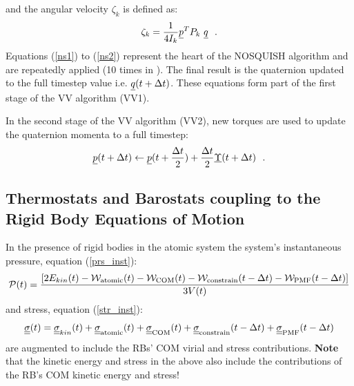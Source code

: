 and the angular velocity $\zeta_{k}$ is defined as:
\begin{equation}
\zeta_{k}={1 \over 4 I_{k}}\mbox{$\underline{p}$}^{T} P_{k}~\mbox{$\underline{q}$}~~.
\end{equation}
Equations (\ref{ns1}) to (\ref{ns2}) represent the heart of the NOSQUISH algorithm
and are repeatedly applied (10 times in \D).  The final result is the quaternion
updated to the full timestep value i.e. $\mbox{$\underline{q}$}(t+\Delta t)$.  These equations
form part of the first stage of the VV algorithm (VV1).

In the second stage of the VV algorithm (VV2), new torques are used to update the
quaternion momenta to a full timestep:
\begin{equation}
\mbox{$\underline{p}$}(t+\Delta t) \leftarrow \mbox{$\underline{p}$}(t+{\Delta t \over 2})+{\Delta t \over 2} \mbox{$\underline{\Upsilon}$}(t+\Delta t)~~.
\end{equation}

\subsection{Thermostats and Barostats coupling to the Rigid Body Equations of Motion}

In the presence of rigid bodies in the atomic system the system's instantaneous pressure,
equation (\ref{prs_inst}):
\begin{equation}
{\cal P}(t) = \frac{\left[ 2 E_{kin}(t) -
{\cal W}_{\rm atomic}(t) - {\cal W}_{\rm COM}(t) -
{\cal W}_{\rm constrain}(t - \Delta t) -
{\cal W}_{\rm PMF}(t - \Delta t) \right]} {3 V(t)}
\end{equation}
and stress, equation (\ref{str_inst}):
\begin{equation}
\mbox{$\underline{\underline{\bf \sigma}}$}(t) = \mbox{$\underline{\underline{\bf \sigma}}$}_{kin}(t) +
\mbox{$\underline{\underline{\bf \sigma}}$}_{\rm atomic}(t) + \mbox{$\underline{\underline{\bf \sigma}}$}_{\rm COM}(t) +
\mbox{$\underline{\underline{\bf \sigma}}$}_{\rm constrain}(t - \Delta t) + \mbox{$\underline{\underline{\bf \sigma}}$}_{\rm PMF}(t - \Delta t)
\end{equation}
are augmented to include the RBs' COM virial and stress contributions.  {\bf Note} that
the kinetic energy and stress in the above also include the contributions of the
RB's COM kinetic energy and stress!

